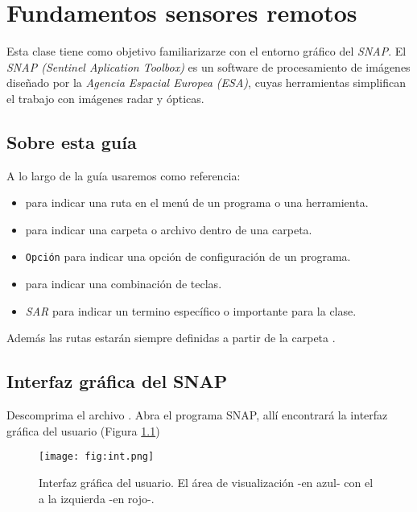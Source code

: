 \chapter{Fundamentos sensores remotos}

Esta clase tiene como objetivo familiarizarze con el entorno gráfico del \emph{SNAP}. El \emph{SNAP (Sentinel Aplication Toolbox)} es un  software de procesamiento de imágenes diseñado por la \emph{Agencia Espacial Europea (ESA)}, cuyas herramientas simplifican el trabajo con imágenes radar y ópticas.



\section{Sobre esta guía}

A lo largo de la guía usaremos como referencia:

\begin{itemize}
  \item {} para indicar una ruta en el menú de un programa o una herramienta.
  \item {} para indicar una carpeta o archivo dentro de una carpeta.
  \item \texttt{Opción} para indicar una opción de configuración de un programa.
  \item {} para indicar una combinación de teclas.
  \item \emph{SAR} para indicar un termino específico o importante para la clase.
\end{itemize}

Además las rutas estarán siempre definidas a partir de la carpeta .

\section{Interfaz gráfica del SNAP}

Descomprima el archivo . Abra el programa SNAP, allí encontrará la interfaz gráfica del usuario (Figura \ref{fig:int})

\begin{figure}[h!]
    \centering
    \texttt{[image: fig:int.png]}
    \caption{Interfaz gráfica del usuario. El área de visualización -en azul- con el  a la izquierda -en rojo-.}
    \label{fig:int}
\end{figure}

